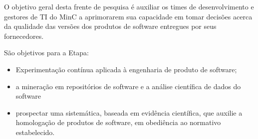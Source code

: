 O objetivo geral desta frente de pesquisa é auxiliar os times de desenvolvimento 
e gestores de TI do MinC a aprimorarem sua capacidade em tomar decisões acerca 
da qualidade das versões dos produtos de software entregues por seus fornecedores. 

São objetivos para a Etapa:

\begin{itemize}
 \item  Experimentação contínua aplicada à engenharia de produto de software;
 \item a mineração em repositórios de software e a análise científica de dados do software
 \item prospectar uma sistemática, baseada em evidência científica, que auxilie 
  a homologação de produtos de software, em obediência ao normativo estabelecido.
\end{itemize}
